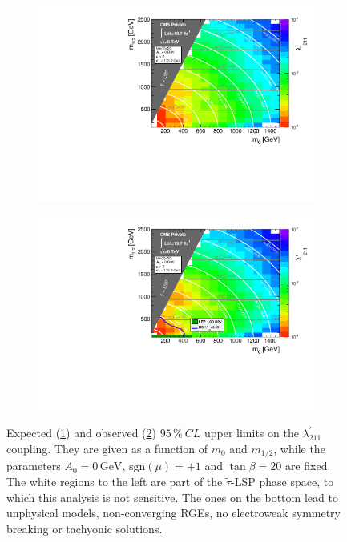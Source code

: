 \begin{figure}[!htbp]
  \centering
  \begin{subfigure}[b]{0.85\textwidth}
    \centering
    \includegraphics[width=\textwidth]{plots/l211limits_MultiBin_expected_logz-colz.pdf}
    \caption{\label{fig:lambda-prime-exp}}
  \end{subfigure}
  \begin{subfigure}[b]{0.85\textwidth}
    \centering
    \includegraphics[width=\textwidth]{plots/l211limits_MultiBin_logz-colz.pdf}
    \caption{\label{fig:lambda-prime-obs}}
  \end{subfigure}
  \caption{Expected (\ref{fig:lambda-prime-exp}) and observed (\ref{fig:lambda-prime-obs}) $95\,\%\: CL$ upper limits on the $\lambda^{\prime}_{211}$ coupling. They are given as a function of $m_0$ and $m_{1/2}$, while the parameters $A_0 = 0\,\text{GeV}$, $\text{sgn}(\mu) = +1$ and $\tan{\beta} = 20$ are fixed. The white regions to the left are part of the $\tilde{\tau}$-LSP phase space, to which this analysis is not sensitive. The ones on the bottom lead to unphysical models, non-converging RGEs, no electroweak symmetry breaking or tachyonic solutions.}
  \label{fig:lambda-prime-limits}
\end{figure}

